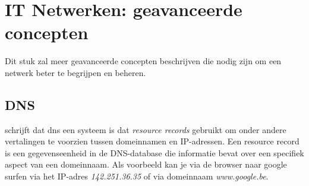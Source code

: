 \section{IT Netwerken: geavanceerde concepten}
Dit stuk zal meer geavanceerde concepten beschrijven die nodig zijn om een netwerk beter te begrijpen en beheren.

\subsection{DNS}
\textcite{Mockapetris1987} schrijft dat \acrshort{dns} een systeem is dat \textit{resource records} gebruikt om onder andere vertalingen te voorzien tussen domeinnamen en IP-adressen. Een resource record is een gegevenseenheid in de DNS-database die informatie bevat over een specifiek aspect van een domeinnaam. Als voorbeeld kan je via de browser naar google surfen via het IP-adres \textit{142.251.36.35} of via domeinnaam \textit{www.google.be}. 

